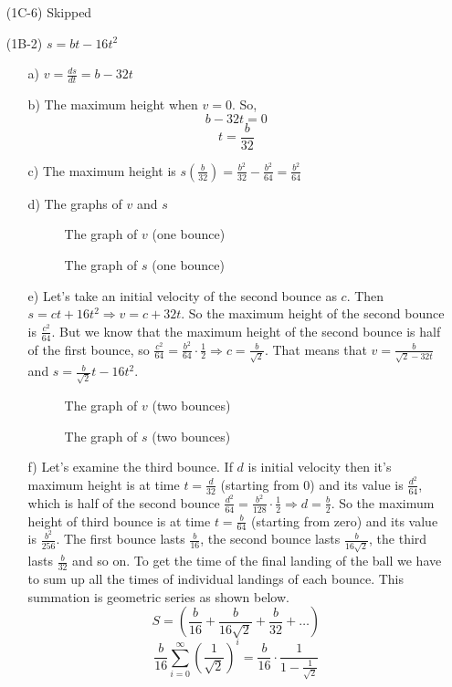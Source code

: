 \documentclass{article}
\begin{document}
\begin{itemize}
\item[(1C-6)]
Skipped
\item[(1B-2)] $s = bt - 16t^2$
\begin{itemize}
\item[a)] $v = \frac{ds}{dt} = b - 32t$
\item[b)] The maximum height when $v = 0$. So,
\[ b - 32t = 0 \]
\[ t = \frac{b}{32}\]
\item[c)] The maximum height is $s(\frac{b}{32}) = \frac{b^2}{32} - \frac{b^2}{64} = \frac{b^2}{64}$
\newpage
\item[d)] The graphs of $v$ and $s$
\begin{figure}[htp!]
    \centering
    
    \caption{The graph of $v$ (one bounce)}
    \label{fig:fig5}
\end{figure}
\newpage
\begin{figure}[htp!]
    \centering
    
    \label{fig:fig6}
    \caption{The graph of $s$ (one bounce)}
\end{figure}
\newpage
\item[e)] Let's take an initial velocity of the second bounce as $c$. Then $s = ct + 16t^2 \Rightarrow v = c + 32t$. So the maximum height of the second bounce is $\frac{c^2}{64}$. But we know that the maximum height of the second bounce is half of the first bounce, so $\frac{c^2}{64} = \frac{b^2}{64} \cdot \frac{1}{2} \Rightarrow c = \frac{b}{\sqrt{2}}$. That means that $v = \frac{b}{\sqrt{2} - 32t}$ and $s = \frac{b}{\sqrt{2}}t - 16t^2$.
\begin{figure}[htp!]
    \centering
    
    \label{fig:fig7}
    \caption{The graph of $v$ (two bounces)}
\end{figure}
\newpage
\begin{figure}[htp!]
    \centering
    
    \label{fig:fig8}
    \caption{The graph of $s$ (two bounces)}
\end{figure}

\item[f)] Let's examine the third bounce. If $d$ is initial velocity then it's maximum height is at time $t = \frac{d} {32}$ (starting from $0$) and its value is $\frac{d^2}{64}$, which is half of the second bounce $\frac{d^2}{64} = \frac{b^2}{128} \cdot \frac{1}{2} \Rightarrow d = \frac{b}{2}$. So the maximum height of third bounce is at time $t = \frac{b}{64}$ (starting from zero) and its value is $\frac{b^2}{256}$. The first bounce lasts $\frac{b}{16}$, the second bounce lasts $\frac{b}{16\sqrt{2}}$, the third lasts $\frac{b}{32}$ and so on. To get the time of the final landing of the ball we have to sum up all the times of individual landings of each bounce. This summation is geometric series as shown below.
\[ S = (\frac{b}{16} + \frac{b}{16\sqrt{2}} + \frac{b}{32} + \dots)\]
\[\frac{b}{16}\sum_{i = 0} ^\infty \left( \frac{1}{\sqrt{2}} \right)^i = \frac{b}{16} \cdot \frac{1}{1 - \frac{1}{\sqrt{2}}} \]


\end{itemize}
\end{itemize}
\end{document}
